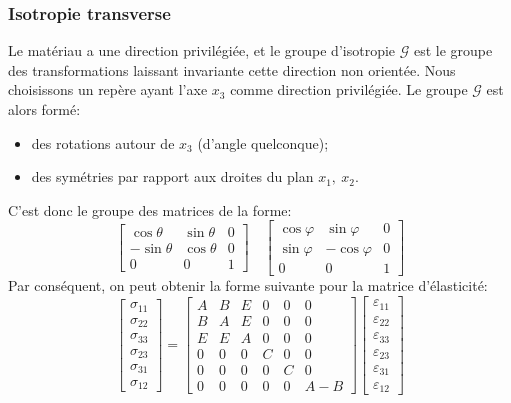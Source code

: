 \subsubsection{Isotropie transverse}
Le matériau a une direction privilégiée, et le groupe d'isotropie $\mathcal{G}$ est le groupe des transformations laissant invariante cette direction non orientée.
Nous choisissons un repère ayant l'axe $x_3$ comme direction privilégiée.
Le groupe $\mathcal{G}$ est alors formé:
\begin{itemize}
    \item des rotations autour de $x_3$ (d'angle quelconque);
    \item des symétries par rapport aux droites du plan $x_1,\ x_2$.
\end{itemize}
C'est donc le groupe des matrices de la forme:
\begin{equation}
    \begin{bmatrix}
        \cos \theta & \sin \theta & 0 \\
        -\sin \theta & \cos \theta & 0 \\
        0 & 0 & 1
    \end{bmatrix}
    \quad
    \begin{bmatrix}
        \cos \varphi & \sin \varphi & 0 \\
        \sin \varphi & -\cos \varphi & 0 \\
        0 & 0 & 1
    \end{bmatrix}
    \label{eq:Ch05-019}
\end{equation}
Par conséquent, on peut obtenir la forme suivante pour la matrice d'élasticité: 
\begin{equation}
    \begin{bmatrix}
        \sigma_{11}\\
        \sigma_{22}\\
        \sigma_{33}\\
        \sigma_{23}\\
        \sigma_{31}\\
        \sigma_{12}
    \end{bmatrix}
    =
    \begin{bmatrix}
        A & B & E & 0 & 0 & 0 \\
        B & A & E & 0 & 0 & 0 \\
        E & E & A & 0 & 0 & 0 \\
        0 & 0 & 0 & C & 0 & 0 \\
        0 & 0 & 0 & 0 & C & 0 \\
        0 & 0 & 0 & 0 & 0 & A-B
    \end{bmatrix}
    \begin{bmatrix}
        \varepsilon_{11}\\
        \varepsilon_{22}\\
        \varepsilon_{33}\\
        \varepsilon_{23}\\
        \varepsilon_{31}\\
        \varepsilon_{12}
    \end{bmatrix}
    \label{eq:Ch05-020}
\end{equation}
